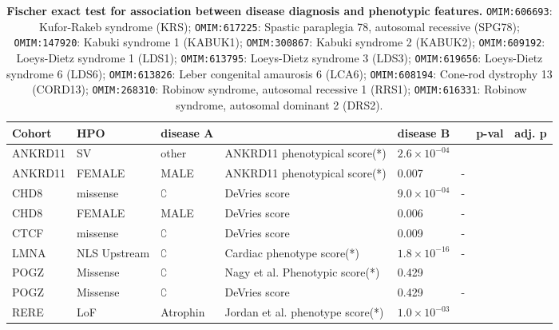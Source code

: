 \begin{table}
\centering
\begin{scriptsize}
\begin{tabular}{l>{\raggedright}p{2.5cm}llllrr}
\toprule
\textbf{Cohort} & \textbf{HPO} & \textbf{disease A} & \textbf{} & \textbf{disease B} & \textbf{} & \textbf{p-val} & \textbf{adj. p}\\
\midrule
ANKRD11 & SV & other & ANKRD11 phenotypical score(*) & $2.6 \times 10^{-04}$ & \cite{PMID_36446582}\\
ANKRD11 & FEMALE & MALE & ANKRD11 phenotypical score(*) & 0.007 & -\\
CHD8 & missense & $\complement$ & DeVries score & $9.0 \times 10^{-04}$ & -\\
CHD8 & FEMALE & MALE & DeVries score & 0.006 & -\\
CTCF & missense & $\complement$ & DeVries score & 0.009 & -\\
LMNA & NLS Upstream & $\complement$ & Cardiac phenotype score(*)& $1.8 \times 10^{-16}$ & -\\
POGZ & Missense & $\complement$ &  Nagy et al. Phenotypic  score(*)  & 0.429 & \cite{PMID_35052493}\\
POGZ & Missense & $\complement$ &  DeVries score & 0.429 & -\\
RERE & LoF & Atrophin & Jordan et al.  phenotype score(*)  & $1.0 \times 10^{-03}$ & \cite{PMID_29330883}\\
\bottomrule
\end{tabular}
\end{scriptsize}
\caption{\textbf{Fischer exact test for association between disease diagnosis and phenotypic features.}
\texttt{OMIM:606693}: Kufor-Rakeb syndrome (KRS);
 \texttt{OMIM:617225}: Spastic paraplegia 78, autosomal recessive (SPG78);
 \texttt{OMIM:147920}: Kabuki syndrome 1 (KABUK1);
 \texttt{OMIM:300867}: Kabuki syndrome 2 (KABUK2);
 \texttt{OMIM:609192}: Loeys-Dietz syndrome 1 (LDS1);
 \texttt{OMIM:613795}:  Loeys-Dietz syndrome 3 (LDS3);
 \texttt{OMIM:619656}: Loeys-Dietz syndrome 6 (LDS6);
 \texttt{OMIM:613826}: Leber congenital amaurosis 6 (LCA6);
 \texttt{OMIM:608194}:  Cone-rod dystrophy 13 (CORD13);
 \texttt{OMIM:268310}: Robinow syndrome, autosomal recessive 1 (RRS1);
 \texttt{OMIM:616331}: Robinow syndrome, autosomal dominant 2 (DRS2).
}
\label{tab:disease_dx}
\end{table}



\clearpage
\newpage

